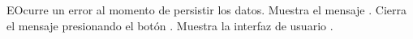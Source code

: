 \begin{UCtrayectoriaA}{E}{Ocurre un error al momento de persistir los datos.}
	\UCpaso Muestra el mensaje .
	\UCpaso[\UCactor] Cierra el mensaje presionando el botón .
	\UCpaso Muestra la interfaz de usuario .
\end{UCtrayectoriaA}
